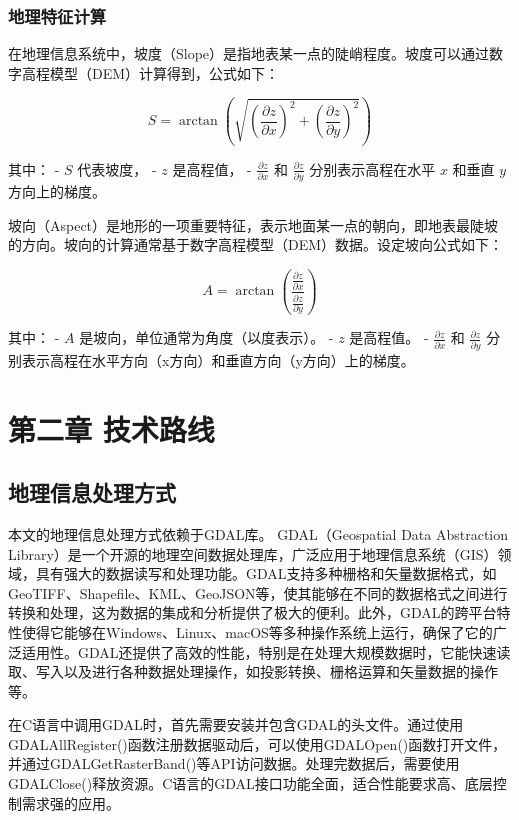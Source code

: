 \documentclass{article}
\begin{document}
		\subsubsection{地理特征计算}
		
		在地理信息系统中，坡度（Slope）是指地表某一点的陡峭程度。坡度可以通过数字高程模型（DEM）计算得到，公式如下：
		
		\[
		S = \arctan \left( \sqrt{ \left( \frac{\partial z}{\partial x} \right)^2 + \left( \frac{\partial z}{\partial y} \right)^2 } \right)
		\]
		
		其中：
		- \( S \) 代表坡度，
		- \( z \) 是高程值，
		- \( \frac{\partial z}{\partial x} \) 和 \( \frac{\partial z}{\partial y} \) 分别表示高程在水平 \( x \) 和垂直 \( y \) 方向上的梯度。

		
		坡向（Aspect）是地形的一项重要特征，表示地面某一点的朝向，即地表最陡坡的方向。坡向的计算通常基于数字高程模型（DEM）数据。设定坡向公式如下：
		
		\[
		A = \arctan \left( \frac{ \frac{\partial z}{\partial x} }{ \frac{\partial z}{\partial y} } \right)
		\]
		
		其中：
		- \( A \) 是坡向，单位通常为角度（以度表示）。
		- \( z \) 是高程值。
		- \( \frac{\partial z}{\partial x} \) 和 \( \frac{\partial z}{\partial y} \) 分别表示高程在水平方向（x方向）和垂直方向（y方向）上的梯度。
		
		
	\section{第二章 技术路线}
	
	
	\subsection{地理信息处理方式}

	本文的地理信息处理方式依赖于GDAL库。
	GDAL（Geospatial Data Abstraction Library）是一个开源的地理空间数据处理库，广泛应用于地理信息系统（GIS）领域，具有强大的数据读写和处理功能。GDAL支持多种栅格和矢量数据格式，如GeoTIFF、Shapefile、KML、GeoJSON等，使其能够在不同的数据格式之间进行转换和处理，这为数据的集成和分析提供了极大的便利。此外，GDAL的跨平台特性使得它能够在Windows、Linux、macOS等多种操作系统上运行，确保了它的广泛适用性。GDAL还提供了高效的性能，特别是在处理大规模数据时，它能快速读取、写入以及进行各种数据处理操作，如投影转换、栅格运算和矢量数据的操作等。
	
	在C语言中调用GDAL时，首先需要安装并包含GDAL的头文件。通过使用GDALAllRegister()函数注册数据驱动后，可以使用GDALOpen()函数打开文件，并通过GDALGetRasterBand()等API访问数据。处理完数据后，需要使用GDALClose()释放资源。C语言的GDAL接口功能全面，适合性能要求高、底层控制需求强的应用。
	
\end{document}
